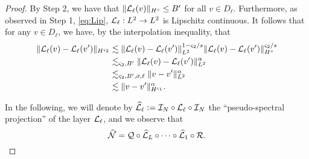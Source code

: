 \documentclass[reqno,a4paper]{amsart}
\begin{document}
\begin{proof}
By Step 2, we have that $\Vert \mathcal{L}_\ell(v) \Vert_{H^s} \le B'$ for all $v\in D_\ell$. Furthermore, as observed in Step 1, \eqref{eq:Lip}, $\mathcal{L}_\ell: L^2 \to L^2$ is Lipschitz continuous. It follows that for any $v\in D_\ell$, we have, by the interpolation inequality, that
\begin{align*}
\Vert \mathcal{L}_\ell(v) - \mathcal{L}_\ell(v') \Vert_{H^{\varsigma_2}}
&\lesssim
\Vert \mathcal{L}_\ell(v) - \mathcal{L}_\ell(v') \Vert_{L^2}^{1-\varsigma_2/s}
\Vert \mathcal{L}_\ell(v) - \mathcal{L}_\ell(v') \Vert_{H^s}^{\varsigma_2/s}
\\
&\lesssim_{\varsigma_2,B'}
\Vert \mathcal{L}_\ell(v) - \mathcal{L}_\ell(v') \Vert_{L^2}^{\alpha}
\\
&\lesssim_{\varsigma_2,B',\sigma,\ell} 
\Vert v - v' \Vert_{L^2}^\alpha
\\
&\lesssim
\Vert v - v' \Vert_{H^{\varsigma_1}}^\alpha.
\end{align*}


In the following, we will denote by $\widehat{\mathcal{L}}_{\ell} := \mathcal{I}_N \circ \mathcal{L}_{\ell} \circ \mathcal{I}_N$ the ``pseudo-spectral projection'' of the layer $\mathcal{L}_\ell$, and we observe that
\[
\widehat{\mathcal{N}} = \mathcal{Q} \circ \widehat{\mathcal{L}}_L \circ \dots \circ \widehat{\mathcal{L}}_1 \circ \mathcal{R}.
\]


\end{proof}
\end{document}
